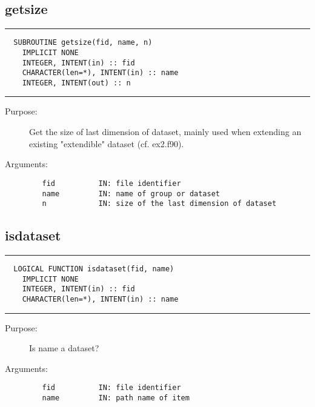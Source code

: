 \documentclass[a4paper]{article}
\begin{document}
\subsection{getsize}

\par
\addvspace{\medskipamount}
\nopagebreak\hrule
\begin{verbatim}
  SUBROUTINE getsize(fid, name, n)
    IMPLICIT NONE
    INTEGER, INTENT(in) :: fid
    CHARACTER(len=*), INTENT(in) :: name
    INTEGER, INTENT(out) :: n
\end{verbatim}
\nopagebreak\hrule
\addvspace{\medskipamount}

\begin{description}
\item[Purpose:] \mbox{}

Get the size of last dimension of dataset, mainly
used when extending an existing "extendible" dataset (cf. ex2.f90).

\item[Arguments:] \mbox{}

\begin{verbatim}
   fid          IN: file identifier
   name         IN: name of group or dataset
   n            IN: size of the last dimension of dataset

\end{verbatim}


\end{description}





\subsection{isdataset}

\par
\addvspace{\medskipamount}
\nopagebreak\hrule
\begin{verbatim}
  LOGICAL FUNCTION isdataset(fid, name)
    IMPLICIT NONE
    INTEGER, INTENT(in) :: fid
    CHARACTER(len=*), INTENT(in) :: name
\end{verbatim}
\nopagebreak\hrule
\addvspace{\medskipamount}

\begin{description}
\item[Purpose:] \mbox{}

Is name a dataset?

\item[Arguments:] \mbox{}

\begin{verbatim}
   fid          IN: file identifier
   name         IN: path name of item

\end{verbatim}


\end{description}
\end{document}
